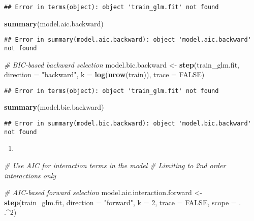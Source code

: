 \documentclass[]{article}
\newenvironment{Shaded}{\begin{snugshade}}{\end{snugshade}}
\newcommand{\CommentTok}[1]{\textcolor[rgb]{0.56,0.35,0.01}{\textit{#1}}}
\newcommand{\DataTypeTok}[1]{\textcolor[rgb]{0.13,0.29,0.53}{#1}}
\newcommand{\DecValTok}[1]{\textcolor[rgb]{0.00,0.00,0.81}{#1}}
\newcommand{\KeywordTok}[1]{\textcolor[rgb]{0.13,0.29,0.53}{\textbf{#1}}}
\newcommand{\NormalTok}[1]{#1}
\newcommand{\OperatorTok}[1]{\textcolor[rgb]{0.81,0.36,0.00}{\textbf{#1}}}
\newcommand{\OtherTok}[1]{\textcolor[rgb]{0.56,0.35,0.01}{#1}}
\newcommand{\StringTok}[1]{\textcolor[rgb]{0.31,0.60,0.02}{#1}}
\begin{document}
\begin{verbatim}
## Error in terms(object): object 'train_glm.fit' not found
\end{verbatim}

\begin{Shaded}
\begin{Highlighting}[]
\KeywordTok{summary}\NormalTok{(model.aic.backward)}
\end{Highlighting}
\end{Shaded}

\begin{verbatim}
## Error in summary(model.aic.backward): object 'model.aic.backward' not found
\end{verbatim}

\begin{Shaded}
\begin{Highlighting}[]
\CommentTok{# BIC-based backward selection}
\NormalTok{model.bic.backward <-}\StringTok{ }\KeywordTok{step}\NormalTok{(train_glm.fit, }\DataTypeTok{direction =} \StringTok{"backward"}\NormalTok{, }\DataTypeTok{k =} \KeywordTok{log}\NormalTok{(}\KeywordTok{nrow}\NormalTok{(train)), }\DataTypeTok{trace =} \OtherTok{FALSE}\NormalTok{)}
\end{Highlighting}
\end{Shaded}

\begin{verbatim}
## Error in terms(object): object 'train_glm.fit' not found
\end{verbatim}

\begin{Shaded}
\begin{Highlighting}[]
\KeywordTok{summary}\NormalTok{(model.bic.backward)}
\end{Highlighting}
\end{Shaded}

\begin{verbatim}
## Error in summary(model.bic.backward): object 'model.bic.backward' not found
\end{verbatim}

\begin{enumerate}
\def\labelenumi{(\alph{enumi})}
\setcounter{enumi}{2}
\item
\end{enumerate}

\begin{Shaded}
\begin{Highlighting}[]
\CommentTok{# Use AIC for interaction terms in the model}
\CommentTok{# Limiting to 2nd order interactions only}

\CommentTok{# AIC-based forward selection}
\NormalTok{model.aic.interaction.forward <-}\StringTok{ }\KeywordTok{step}\NormalTok{(train_glm.fit, }\DataTypeTok{direction =} \StringTok{"forward"}\NormalTok{, }\DataTypeTok{k =} \DecValTok{2}\NormalTok{, }\DataTypeTok{trace =} \OtherTok{FALSE}\NormalTok{,}
                                      \DataTypeTok{scope =}\NormalTok{ . }\OperatorTok{~}\StringTok{ }\NormalTok{.}\OperatorTok{^}\DecValTok{2}\NormalTok{)}
\end{Highlighting}
\end{Shaded}
\end{document}

